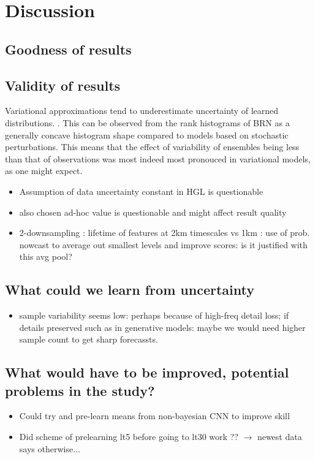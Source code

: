 \chapter{Discussion}
\label{chapter:discussion}

\section{Goodness of results}
\section{Validity of results}

Variational approximations tend to underestimate uncertainty of learned distributions. \cite{bishop2006pattern, minka_family_nodate}. This can be observed from the rank histograms of BRN as a generally concave histogram shape compared to models based on stochastic perturbations. This means that the effect of variability of ensembles being less than that of observations was most indeed most pronouced in variational models, as one might expect. 

\begin{itemize}
	\item Assumption of data uncertainty constant in HGL is questionable
	\item also chosen ad-hoc value is questionable and might affect result quality 
	\item 2-downsampling : lifetime of features at 2km timescales vs 1km : use of prob. nowcast to average out smallest levels and improve scores: is it justified with this avg pool?
\end{itemize}
\section{What could we learn from uncertainty}

\begin{itemize}
	\item sample variability seems low: perhaps because of high-freq detail loss; if details preserved such as in generative models: maybe we would need higher sample count to get sharp forecassts.
\end{itemize}
\section{What would have to be improved, potential problems in the study?}

\begin{itemize}
	\item Could try and pre-learn means from non-bayesian CNN to improve skill
	\item Did scheme of prelearning lt5 before going to lt30 work ?? $\to$ newest data says otherwise...
\end{itemize}

